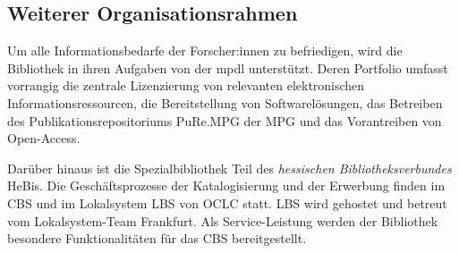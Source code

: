 \subsection{Weiterer Organisationsrahmen}
Um alle Informationsbedarfe der Forscher:innen zu befriedigen, wird die Bibliothek in ihren Aufgaben von der
\acrfull{mpdl} unterstützt. Deren Portfolio umfasst vorrangig die zentrale 
Lizenzierung von relevanten elektronischen Informationsressourcen, die Bereitstellung von Softwarelösungen, 
das Betreiben des Publikationsrepositoriums \acrshort{PuRe.MPG} der \acrfull{MPG} und
das Vorantreiben von Open-Access. 

Darüber hinaus ist die Spezialbibliothek Teil des \textit{hessischen Bibliotheksverbundes} \acrshort{HeBis}. 
Die Geschäftsprozesse der Katalogisierung und der Erwerbung finden im \acrfull{CBS} und 
im Lokalsystem \acrfull{LBS} von \acrfull{OCLC} statt. \acrshort{LBS} wird gehostet und betreut vom Lokalsystem-Team Frankfurt. 
Als Service-Leistung werden der Bibliothek besondere Funktionalitäten für das \acrlong{CBS} bereitgestellt.


